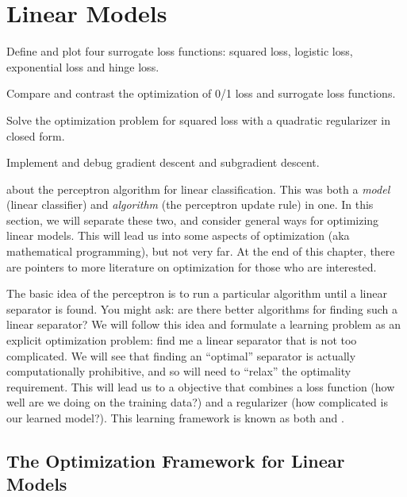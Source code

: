 \chapter{Linear Models} \label{sec:loss}


\begin{learningobjectives}
\item Define and plot four surrogate loss functions: squared loss,
  logistic loss, exponential loss and hinge loss.
\item Compare and contrast the optimization of 0/1 loss and surrogate
  loss functions.
\item Solve the optimization problem for squared loss with a
  quadratic regularizer in closed form.
\item Implement and debug gradient descent and subgradient descent.
\end{learningobjectives}

\dependencies{}

 about the perceptron
algorithm for linear classification.  This was both a \emph{model}
(linear classifier) and \emph{algorithm} (the perceptron update rule)
in one.  In this section, we will separate these two, and consider
general ways for optimizing linear models.  This will lead us into
some aspects of optimization (aka mathematical programming), but not
very far.  At the end of this chapter, there are pointers to more
literature on optimization for those who are interested.

The basic idea of the perceptron is to run a particular algorithm
until a linear separator is found.  You might ask: are there better
algorithms for finding such a linear separator?  We will follow this
idea and formulate a learning problem as an explicit optimization
problem: find me a linear separator that is not too complicated.  We
will see that finding an ``optimal'' separator is actually
computationally prohibitive, and so will need to ``relax'' the
optimality requirement.  This will lead us to a 
objective that combines a loss function (how well are we doing on the
training data?) and a regularizer (how complicated is our learned
model?).  This learning framework is known as both  and .

\section{The Optimization Framework for Linear Models}

